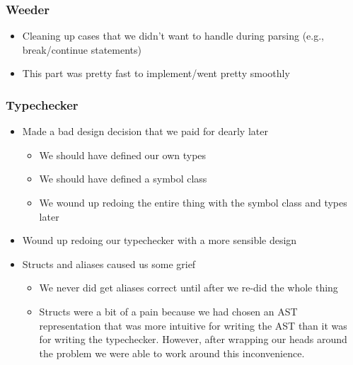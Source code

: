 \documentclass{article}
\begin{document}
\subsubsection{Weeder}
\begin{itemize}
\item Cleaning up cases that we didn't want to handle during parsing (e.g., break/continue statements)
\item This part was pretty fast to implement/went pretty smoothly
\end{itemize}
\subsubsection{Typechecker}
\begin{itemize}
\item Made a bad design decision that we paid for dearly later
	\begin{itemize}
		\item We should have defined our own types
		\item We should have defined a symbol class
		\item We wound up redoing the entire thing with the symbol class and types later
	\end{itemize}
\item Wound up redoing our typechecker with a more sensible design
\item Structs and aliases caused us some grief
	\begin{itemize}
		\item We never did get aliases correct until after we re-did the whole thing
		\item Structs were a bit of a pain because we had chosen an AST representation that was more intuitive for writing the AST than it was for writing the typechecker. However, after wrapping our heads around the problem we were able to work around this inconvenience.
	\end{itemize}
\end{itemize}
\end{document}
